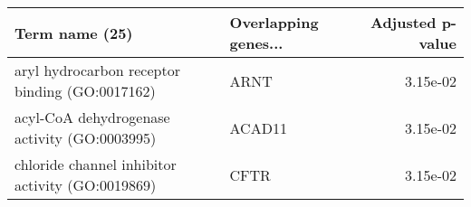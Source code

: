 \begin{tabular}{llr}
\toprule
                                  Term name (25) & Overlapping genes... &  Adjusted p-value \\
\midrule
  aryl hydrocarbon receptor binding (GO:0017162) &                 ARNT &          3.15e-02 \\
    acyl-CoA dehydrogenase activity (GO:0003995) &               ACAD11 &          3.15e-02 \\
chloride channel inhibitor activity (GO:0019869) &                 CFTR &          3.15e-02 \\
\bottomrule
\end{tabular}
